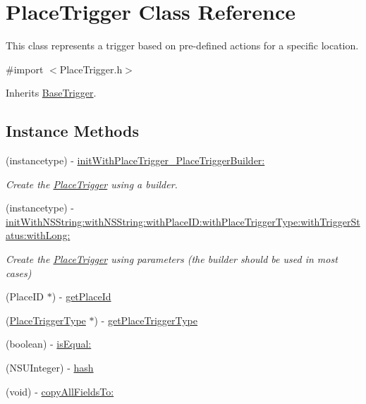 \hypertarget{interface_place_trigger}{}\section{Place\+Trigger Class Reference}
\label{interface_place_trigger}


This class represents a trigger based on pre-\/defined actions for a specific location.  




{\ttfamily \#import $<$Place\+Trigger.\+h$>$}



Inherits \hyperlink{interface_base_trigger}{Base\+Trigger}.

\subsection*{Instance Methods}
\begin{DoxyCompactItemize}
\item 
(instancetype) -\/ \hyperlink{interface_place_trigger_a4c688f949318f4cee520d6c1e8856013}{init\+With\+Place\+Trigger\+\_\+\+Place\+Trigger\+Builder\+:}
\begin{DoxyCompactList}\small\item\em Create the \hyperlink{interface_place_trigger}{Place\+Trigger} using a builder. \end{DoxyCompactList}\item 
(instancetype) -\/ \hyperlink{interface_place_trigger_aad2166e09684eea144b7095fb4655834}{init\+With\+N\+S\+String\+:with\+N\+S\+String\+:with\+Place\+I\+D\+:with\+Place\+Trigger\+Type\+:with\+Trigger\+Status\+:with\+Long\+:}
\begin{DoxyCompactList}\small\item\em Create the \hyperlink{interface_place_trigger}{Place\+Trigger} using parameters (the builder should be used in most cases) \end{DoxyCompactList}\item 
(Place\+I\+D $\ast$) -\/ \hyperlink{interface_place_trigger_aac532c4cd696af2febb6d902dddca964}{get\+Place\+Id}
\item 
(\hyperlink{interface_place_trigger_type}{Place\+Trigger\+Type} $\ast$) -\/ \hyperlink{interface_place_trigger_a4e641b2b128707614144f53a5481d1e7}{get\+Place\+Trigger\+Type}
\item 
(boolean) -\/ \hyperlink{interface_place_trigger_a7d3dea259973ed181e3c3ba0cc904939}{is\+Equal\+:}
\item 
(N\+S\+U\+Integer) -\/ \hyperlink{interface_place_trigger_acc3c1a827bd35674bd1581661e5db29d}{hash}
\item 
(void) -\/ \hyperlink{interface_place_trigger_aae4e6005cf2c47925ed18a026b0d66df}{copy\+All\+Fields\+To\+:}
\end{DoxyCompactItemize}
